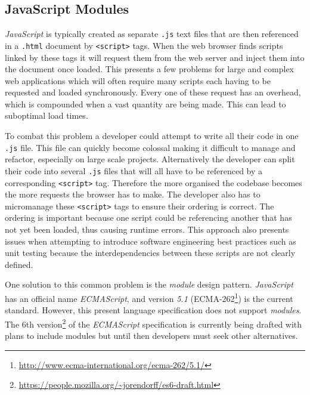 \documentclass[final]{cmpreport}
\begin{document}
\subsection{JavaScript Modules}
\textit{JavaScript} is typically created as separate \texttt{.js} text files that are then referenced in a \texttt{.html} document by \texttt{<script>} tags. When the web browser finds scripts linked by these tags it will request them from the web server and inject them into the document once loaded. This presents a few problems for large and complex web applications which will often require many scripts each having to be requested and loaded synchronously. Every one of these request has an overhead, which is compounded when a vast quantity are being made. This can lead to suboptimal load times.

To combat this problem a developer could attempt to write all their code in one \texttt{.js} file. This file can quickly become colossal making it difficult to manage and refactor, especially on large scale projects. Alternatively the developer can split their code into several \texttt{.js} files that will all have to be referenced by a corresponding \texttt{<script>} tag. Therefore the more organised the codebase becomes the more requests the browser has to make. The developer also has to micromanage these \texttt{<script>} tags to ensure their ordering is correct. The ordering is important because one script could be referencing another that has not yet been loaded, thus causing runtime errors. This approach also presents issues when attempting to introduce software engineering best practices such as unit testing because the interdependencies between these scripts are not clearly defined.

One solution to this common problem is the \textit{module} design pattern. \textit{JavaScript} has an official name \textit{ECMAScript}, and version \textit{5.1} (ECMA-262\footnote{\url{http://www.ecma-international.org/ecma-262/5.1/}}) is the current standard. However, this present language specification does not support \textit{modules}. The 6th version\footnote{\url{https://people.mozilla.org/~jorendorff/es6-draft.html}} of the \textit{ECMAScript} specification is currently being drafted with plans to include modules but until then developers must seek other alternatives.
\end{document}
